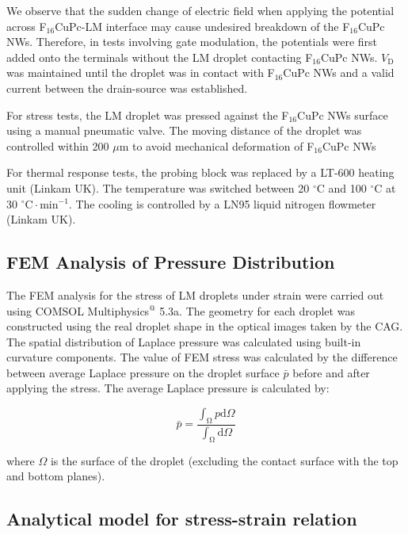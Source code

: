We observe that the sudden change of electric field when applying the
potential across F\(_{\text{16}}\)CuPc-LM interface may cause
undesired breakdown of the F\(_{\text{16}}\)CuPc NWs. Therefore, in
tests involving gate modulation, the potentials were first added onto
the terminals without the LM droplet contacting F\(_{\text{16}}\)CuPc
NWs.  \(V_{\mathrm{D}}\) was maintained until the droplet was in
contact with F\(_{\text{16}}\)CuPc NWs and a valid current between the
drain-source was established.

For stress tests, the LM droplet was pressed against the F\(_{\text{16}}\)CuPc
NWs surface using a manual pneumatic valve. The moving distance of the
droplet was controlled within 200 \(\mu \mathrm{m}\) to avoid mechanical
deformation of F\(_{\text{16}}\)CuPc NWs

For thermal response tests, the probing block was replaced by a LT-600
heating unit (Linkam UK). The temperature was switched between 20
\(^{\circ} \mathrm{C}\) and 100 \(^{\circ} \mathrm{C}\) at 30 \(^{\circ}
\mathrm{C} \cdot \mathrm{min}^{-1}\). The cooling is controlled by a
LN95 liquid nitrogen flowmeter (Linkam UK).

\subsection*{FEM Analysis of Pressure Distribution}
\label{sec:small-orge90523c}
The FEM analysis for the stress of LM droplets under strain were
carried out using COMSOL Multiphysics\(^{\text{@}}\) 5.3a. The geometry for
each droplet was constructed using the real droplet shape in the
optical images taken by the CAG. The spatial distribution of
Laplace pressure was calculated using built-in curvature
components. The value of FEM stress was calculated by the
difference between average Laplace pressure on the droplet surface
\(\bar{p}\) before and after applying the stress. The average Laplace
pressure is calculated by:

\begin{equation}
\label{eq:small-7}
\bar{p} = {\displaystyle \frac{\int_{\mathrm{\Omega}} p \mathrm{d} \Omega}{\int_{\mathrm{\Omega}} \mathrm{d} \Omega}}
\end{equation}

where \(\Omega\) is the surface of the droplet (excluding the contact
surface with the top and bottom planes).

\subsection*{Analytical model for stress-strain relation}
\label{sec:small-orgc12d6dd}


